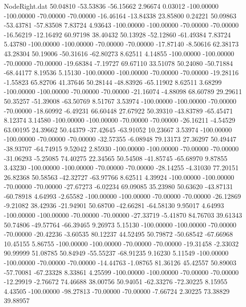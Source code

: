 \begin{filecontents}{NodeRight.dat}
  50.04810  -53.53836  -56.15662     2.96674    0.03012 -100.00000 -100.00000  -70.00000  -70.00000  -16.46164  -13.84338   23.85800    0.24221
  50.09863  -53.43781  -57.83508     7.83724    4.93643 -100.00000 -100.00000  -70.00000  -70.00000  -16.56219  -12.16492   60.97198   38.40432
  50.13928  -52.12860  -61.49384     7.83724    5.43780 -100.00000 -100.00000  -70.00000  -70.00000  -17.87140   -8.50616   62.38173   43.28304
  50.19006  -50.31616  -62.80273     8.62511    4.14855 -100.00000 -100.00000  -70.00000  -70.00000  -19.68384   -7.19727   69.67110   33.51078
  50.24080  -50.71884  -68.44177     8.19536    5.15130 -100.00000 -100.00000  -70.00000  -70.00000  -19.28116   -1.55823   65.82706   41.37646
  50.28144  -48.83926  -65.11902     8.62511    3.68299 -100.00000 -100.00000  -70.00000  -70.00000  -21.16074   -4.88098   68.60789   29.29611
  50.35257  -51.39008  -63.50769     8.51767    3.53974 -100.00000 -100.00000  -70.00000  -70.00000  -18.60992   -6.49231   66.60448   27.67922
  50.39310  -43.83789  -65.45471     8.12374    3.14580 -100.00000 -100.00000  -70.00000  -70.00000  -26.16211   -4.54529   63.00195   24.39662
  50.44379  -37.42645  -63.91052    10.23667    3.53974 -100.00000 -100.00000  -70.00000  -70.00000  -32.57355   -6.08948   79.13173   27.36297
  50.49447  -38.93707  -64.74915     9.52042    2.85930 -100.00000 -100.00000  -70.00000  -70.00000  -31.06293   -5.25085   74.40275   22.34565
  50.54508  -41.85745  -65.68970     9.87855    3.43230 -100.00000 -100.00000  -70.00000  -70.00000  -28.14255   -4.31030   77.20151   26.82368
  50.58563  -42.32727  -63.97766     8.62511    4.39924 -100.00000 -100.00000  -70.00000  -70.00000  -27.67273   -6.02234   69.09085   35.23980
  50.63620  -43.87131  -60.78918     4.64993   -2.65582 -100.00000 -100.00000  -70.00000  -70.00000  -26.12869   -9.21082   38.42936  -21.94901
  50.68700  -42.66281  -64.58130     9.95017    4.64993 -100.00000 -100.00000  -70.00000  -70.00000  -27.33719   -5.41870   84.76703   39.61343
  50.74806  -49.57764  -66.39465     9.26973    5.15130 -100.00000 -100.00000  -70.00000  -70.00000  -20.42236   -3.60535   80.12237   44.52495
  50.79872  -50.68542  -67.66968    10.45155    5.86755 -100.00000 -100.00000  -70.00000  -70.00000  -19.31458   -2.33032   90.99999   51.08785
  50.84949  -55.55237  -68.91235     9.16230    5.11549 -100.00000 -100.00000  -70.00000  -70.00000  -14.44763   -1.08765   81.36126   45.42557
  50.89003  -57.70081  -67.23328     8.33861    4.25599 -100.00000 -100.00000  -70.00000  -70.00000  -12.29919   -2.76672   74.46688   38.00756
  50.94051  -62.33276  -72.30225     8.15955    4.43505 -100.00000  -98.27813  -70.00000  -70.00000   -7.66724    2.30225   73.38829   39.88957

\end{filecontents}
